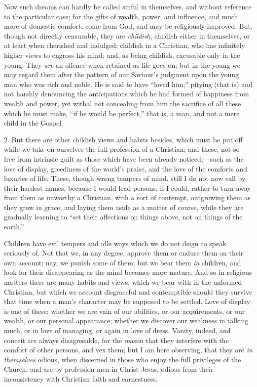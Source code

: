 Now such dreams can hardly be called sinful in
themselves, and without reference to the particular case;
for the gifts of wealth, power, and influence, and much
more of domestic comfort, come from God, and may be
religiously improved. But, though not directly
censurable, they are \emph{childish}; childish either in
themselves, or at least when cherished and indulged;
childish in a Christian, who has infinitely higher views
to engross his mind; and, as being childish, excusable
only in the young. They \emph{are} an offence when
retained as life goes on; but in the young we may regard
them after the pattern of our Saviour's judgment upon the
young man who was rich and noble. He is said to have
``loved him;'' pitying (that is) and not harshly
denouncing the anticipations which he had formed of
happiness from wealth and power, yet withal not
concealing from him the sacrifice of all these which he
must make, ``if he would be perfect,'' that is, a
man, and not a mere child in the Gospel.

2. But there are other childish views and habits
besides, which must be put off while we take on ourselves
the full profession of a Christian; and these, not so
free from intrinsic guilt as those which have been
already noticed;—such as the love of display,
greediness of the world's praise, and the love of the
comforts and luxuries of life. These, though wrong
tempers of mind, still I do not now call by their hardest
names, because I would lead persons, if I could, rather
to turn away from them as unworthy a Christian, with a
sort of contempt, outgrowing them as they grow in grace,
and laying them aside as a matter of course, while they
are gradually learning to ``set their affections on
things above, not on things of the earth.''

Children have evil tempers and idle ways which we do
not deign to speak seriously of. Not that we, in any
degree, approve them or endure them on their own account;
nay, we punish some of them; but we bear them \emph{in}
children, and look for their disappearing as the mind
becomes more mature. And so in religious matters there
are many habits and views, which we bear with in the
unformed Christian, but which we account disgraceful and
contemptible should they survive that time when a man's
character may be supposed to be settled. Love of display
is one of these; whether we are vain of our abilities, or
our acquirements, or our wealth, or our personal
appearance; whether we discover our weakness in talking
much, or in love of managing, or again in love of dress.
Vanity, indeed, and conceit are always disagreeable, for
the reason that they interfere with the comfort of other
persons, and vex them; but I am here observing, that they
are \emph{in themselves} odious, when discerned in those
who enjoy the full privileges of the Church, and are by
profession men in Christ Jesus, odious from their
inconsistency with Christian faith and earnestness.

